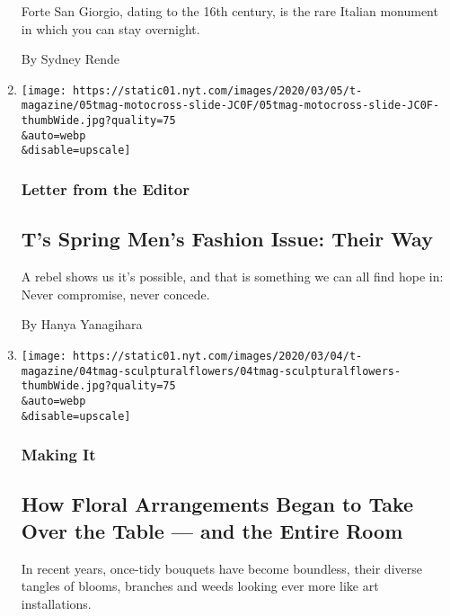\begin{enumerate}
  Forte San Giorgio, dating to the 16th century, is the rare Italian
  monument in which you can stay overnight.

  By Sydney Rende
\item
  \href{/2020/03/05/t-magazine/ts-spring-mens-fashion-issue-their-way.html}{}

  \texttt{[image: https://static01.nyt.com/images/2020/03/05/t-magazine/05tmag-motocross-slide-JC0F/05tmag-motocross-slide-JC0F-thumbWide.jpg?quality=75\\\&auto=webp\\\&disable=upscale]}

  \hypertarget{letter-from-the-editor}{%
  \subsubsection{Letter from the Editor}\label{letter-from-the-editor}}

  \hypertarget{ts-spring-mens-fashion-issue-their-way}{%
  \subsection{T's Spring Men's Fashion Issue: Their
  Way}\label{ts-spring-mens-fashion-issue-their-way}}

  A rebel shows us it's possible, and that is something we can all find
  hope in: Never compromise, never concede.

  By Hanya Yanagihara
\item
  \href{/2020/03/04/t-magazine/flower-arrangements-sculptures.html}{}

  \texttt{[image: https://static01.nyt.com/images/2020/03/04/t-magazine/04tmag-sculpturalflowers/04tmag-sculpturalflowers-thumbWide.jpg?quality=75\\\&auto=webp\\\&disable=upscale]}

  \hypertarget{making-it}{%
  \subsubsection{Making It}\label{making-it}}

  \hypertarget{how-floral-arrangements-began-to-take-over-the-table--and-the-entire-room}{%
  \subsection{How Floral Arrangements Began to Take Over the Table ---
  and the Entire
  Room}\label{how-floral-arrangements-began-to-take-over-the-table--and-the-entire-room}}

  In recent years, once-tidy bouquets have become boundless, their
  diverse tangles of blooms, branches and weeds looking ever more like
  art installations.


\end{enumerate}
